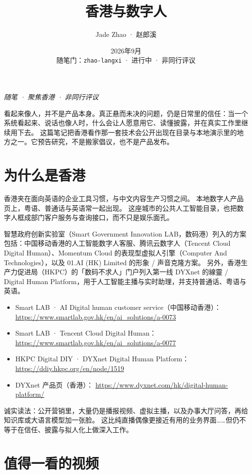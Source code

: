 \documentclass[11pt,a4paper]{ctexart}
\title{香港与数字人}
\author{Jade Zhao · 赵郎溪}
\date{2026年9月 \\ \small 随笔门：\texttt{zhao-langxi} · 进行中 · 非同行评议}
\begin{document}
\maketitle

\noindent\textit{随笔 · 聚焦香港 · 非同行评议}

看起来像人，并不是产品本身。真正悬而未决的问题，仍是日常里的信任：当一个系统看起来、说话也像人时，什么会让人愿意用它、读懂披露，并在真实工作里继续用下去。
这篇笔记把香港看作那一套技术会公开出现在目录与本地演示里的地方之一。它预告研究，不是搬家倡议，也不是产品发布。

\section*{为什么是香港}

香港夹在面向英语的企业工具习惯，与中文内容生产习惯之间。
本地数字人产品页上，粤语、普通话与英语常一起出现。
这座城市的公共人工智能目录，也把数字人框成部门客户服务与查询接口，而不只是娱乐面孔。

智慧政府创新实验室（Smart Government Innovation LAB，数码港）列入的方案包括：中国移动香港的人工智能数字人客服、腾讯云数字人（Tencent Cloud Digital Human）、Momentum Cloud 的表现型虚拟人引擎（Computer And Technologies），以及 01.AI (HK) Limited 的形象 / 声音克隆方案。
另外，香港生产力促进局（HKPC）的「数码不求人」门户列入第一线 DYXnet 的線靈 / Digital Human Platform，用于人工智能主播与实时助理，并支持普通话、粤语与英语。

\begin{itemize}
  \item Smart LAB · AI Digital human customer service（中国移动香港）：
    \url{https://www.smartlab.gov.hk/en/ai_solutions/a-0073}
  \item Smart LAB · Tencent Cloud Digital Human：
    \url{https://www.smartlab.gov.hk/en/ai_solutions/a-0077}
  \item HKPC Digital DIY · DYXnet Digital Human Platform：
    \url{https://ddiy.hkpc.org/en/node/1519}
  \item DYXnet 产品页（香港）：
    \url{https://www.dyxnet.com/hk/digital-human-platform/}
\end{itemize}

诚实读法：公开营销里，大量仍是播报视频、虚拟主播，以及办事大厅问答，再给知识库或大语言模型加一张脸。
这比纯直播偶像更接近有用的业务界面……但仍不等于在信任、披露与拟人化上做深入工作。

\section*{值得一看的视频}
\end{document}
